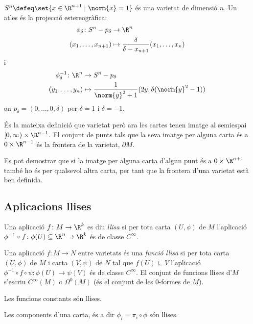 \documentclass[12pt,twocolumn]{article}
\begin{document}
\begin{example}
	\( S^n \defeq \set{x \in \R^{n+1} \mid \norm{x} = 1} \) és una varietat de
	dimensió \( n \). Un atles és la projecció estereogràfica:
	\begin{align*}
		\phi_\delta \colon S^n - p_\delta & \to \R^n \\
		(x_1, \dots, x_{n+1}) & \mapsto \frac{\delta}{\delta - x_{n+1}}(x_1, \dots, x_n)
	\end{align*}
	i
	\begin{align*}
		\phi_\delta^{-1} \colon  \R^n & \to S^n - p_\delta \\
		(y_1, \dots, y_n) & \mapsto \frac{1}{\norm{y}^2 + 1}(2y, \delta(\norm{y}^2 - 1))
	\end{align*}
	on \( p_\delta = (0,\dots,0,\delta) \) per \( \delta = 1 \) i \( \delta = -1 \).
\end{example}

\begin{definition}
	És la mateixa definició que varietat però ara les cartes tenen imatge al semiespai \(
	[0,\infty) \times \R^{n-1} \). El conjunt de punts tals que la seva imatge per alguna
	carta és a \( 0 \times \R^{n-1} \) és la frontera de la varietat, \( \partial M \). 
\end{definition}
\begin{observation}
	Es pot demostrar que si la imatge per alguna carta d'algun punt és a \( 0 \times
	\R^{n+1} \) també ho és per qualsevol altra carta, per tant que la frontera d'una
	varietat està ben definida. 
\end{observation}

\subsection{Aplicacions llises}
\begin{definition}
	Una aplicació \( f \colon M \to \R^k \) es diu \emph{llisa} si per tota carta \(
	(U,\phi) \) de \( M \) l'aplicació \( \phi^{-1} \circ f \colon \phi(U) \subseteq \R^n
	\to \R^k \) és de classe \( C^\infty \).
\end{definition}

\begin{definition}
	Una aplicació \( f \colon M \to N \) entre varietats és una \emph{funció llisa} si per
	tota carta \( (U,\phi) \) de \( M \) i carta \( (V,\psi) \) de \( N \) tal que \( f(U)
	\subseteq V \) l'aplicació \( \phi^{-1} \circ f \circ \psi \colon \phi(U) \to \psi(V) \)
	és de classe \( C^\infty \). El conjunt de funcions llises d'\( M \) s'escriu \(
	C^\infty(M) \) o \( \Omega^0(M) \) (és el conjunt de les 0-formes de \( M \)).
\end{definition}
\begin{example}
	\begin{points}
	\item Les funcions constants són llises.
	\item Les components d'una carta, és a dir \( \phi_i = \pi_i \circ \phi \) són llises. 
	\end{points}
\end{example}
\end{document}
